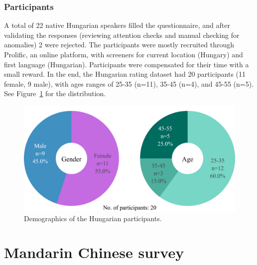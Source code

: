 \documentclass[11pt]{article}
\begin{document}
\subsubsection{Participants}

A total of 22 native Hungarian speakers filled the questionnaire, and after validating the responses (reviewing attention checks and manual checking for anomalies) 2 were rejected. The participants were mostly recruited through Prolific, an online platform, with screeners for current location (Hungary) and first language (Hungarian). Participants were compensated for their time with a small reward. In the end, the Hungarian rating dataset had 20 participants (11 female, 9 male), with ages ranges of 25-35 (n=11), 35-45 (n=4), and 45-55 (n=5). See Figure~\ref{fig:demographics_hu} for the distribution.

\begin{figure}[ht]
  \centering
  \includegraphics[width=\linewidth]{../demographics_hu}
  \caption{Demographics of the Hungarian participants.}
  \label{fig:demographics_hu}
\end{figure}

\section{Mandarin Chinese survey}







\end{document}
